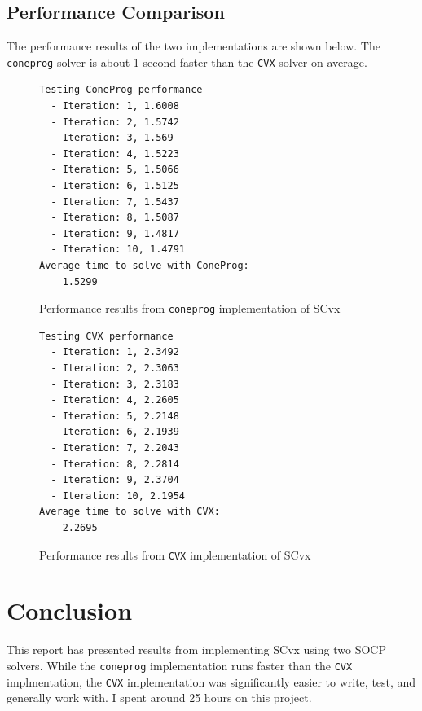 \documentclass{article}
\begin{document}
\subsection{Performance Comparison}

The performance results of the two implementations are shown below.
The \texttt{coneprog} solver is about 1 second faster than the \texttt{CVX} solver on average.

\begin{figure}[H]
  \begin{verbatim}
Testing ConeProg performance
  - Iteration: 1, 1.6008
  - Iteration: 2, 1.5742
  - Iteration: 3, 1.569
  - Iteration: 4, 1.5223
  - Iteration: 5, 1.5066
  - Iteration: 6, 1.5125
  - Iteration: 7, 1.5437
  - Iteration: 8, 1.5087
  - Iteration: 9, 1.4817
  - Iteration: 10, 1.4791
Average time to solve with ConeProg: 
    1.5299
  \end{verbatim}
  \caption*{Performance results from \texttt{coneprog} implementation of SCvx}
\end{figure}

\begin{figure}[H]
  \begin{verbatim}
Testing CVX performance
  - Iteration: 1, 2.3492
  - Iteration: 2, 2.3063
  - Iteration: 3, 2.3183
  - Iteration: 4, 2.2605
  - Iteration: 5, 2.2148
  - Iteration: 6, 2.1939
  - Iteration: 7, 2.2043
  - Iteration: 8, 2.2814
  - Iteration: 9, 2.3704
  - Iteration: 10, 2.1954
Average time to solve with CVX: 
    2.2695
  \end{verbatim}
  \caption*{Performance results from \texttt{CVX} implementation of SCvx}
\end{figure}

\section*{Conclusion}

This report has presented results from implementing SCvx using two SOCP solvers.
While the \texttt{coneprog} implementation runs faster than the \texttt{CVX} implmentation, the \texttt{CVX} implementation was significantly easier to write, test, and generally work with.
I spent around 25 hours on this project.



\end{document}
